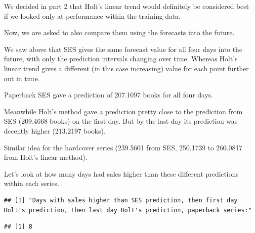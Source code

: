 \documentclass[]{book}
\newenvironment{Shaded}{\begin{snugshade}}{\end{snugshade}}
\newcommand{\DecValTok}[1]{\textcolor[rgb]{0.00,0.00,0.81}{#1}}
\newcommand{\KeywordTok}[1]{\textcolor[rgb]{0.13,0.29,0.53}{\textbf{#1}}}
\newcommand{\NormalTok}[1]{#1}
\newcommand{\OperatorTok}[1]{\textcolor[rgb]{0.81,0.36,0.00}{\textbf{#1}}}
\newcommand{\StringTok}[1]{\textcolor[rgb]{0.31,0.60,0.02}{#1}}
\begin{document}
We decided in part 2 that Holt's linear trend would definitely be considered best if we looked only at performance within the training data.

Now, we are asked to also compare them using the forecasts into the future.

We saw above that SES gives the same forecast value for all four days into the future, with only the prediction intervals changing over time. Whereas Holt's linear trend gives a different (in this case increasing) value for each point further out in time.

Paperback SES gave a prediction of 207.1097 books for all four days.

Meanwhile Holt's method gave a prediction pretty close to the prediction from SES (209.4668 books) on the first day. But by the last day its prediction was decently higher (213.2197 books).

Similar idea for the hardcover series (239.5601 from SES, 250.1739 to 260.0817 from Holt's linear method).

Let's look at how many days had sales higher than these different predictions within each series.

\begin{verbatim}
## [1] "Days with sales higher than SES prediction, then first day Holt's prediction, then last day Holt's prediction, paperback series:"
\end{verbatim}

\begin{Shaded}
\end{Shaded}

\begin{verbatim}
## [1] 8
\end{verbatim}

\begin{Shaded}
\end{Shaded}
\end{document}
